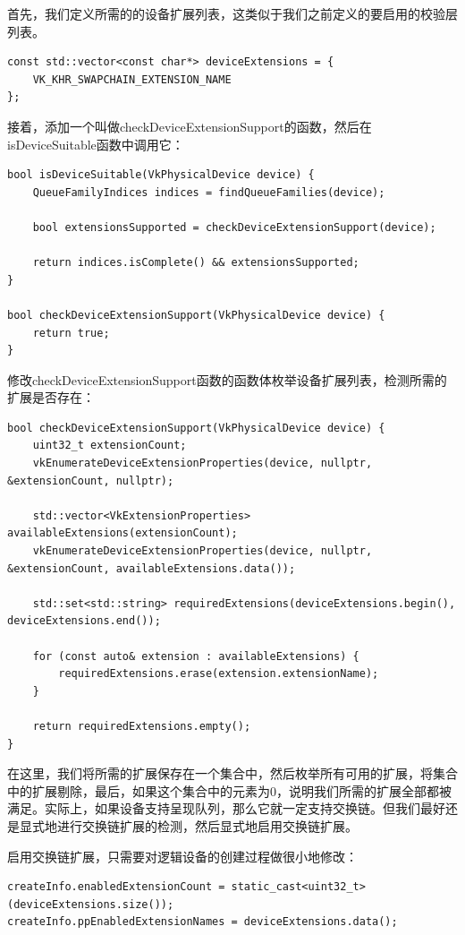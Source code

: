 \documentclass{ctexart}
\begin{document}
首先，我们定义所需的的设备扩展列表，这类似于我们之前定义的要启用的校验层列表。

\begin{lstlisting}[language={[ANSI]C}]
const std::vector<const char*> deviceExtensions = {
	VK_KHR_SWAPCHAIN_EXTENSION_NAME
};
\end{lstlisting}

接着，添加一个叫做checkDeviceExtensionSupport的函数，然后在isDeviceSuitable函数中调用它：

\begin{lstlisting}[language={[ANSI]C}]
bool isDeviceSuitable(VkPhysicalDevice device) {
	QueueFamilyIndices indices = findQueueFamilies(device);

	bool extensionsSupported = checkDeviceExtensionSupport(device);

	return indices.isComplete() && extensionsSupported;
}

bool checkDeviceExtensionSupport(VkPhysicalDevice device) {
	return true;
}
\end{lstlisting}

修改checkDeviceExtensionSupport函数的函数体枚举设备扩展列表，检测所需的扩展是否存在：

\begin{lstlisting}[language={[ANSI]C}]
bool checkDeviceExtensionSupport(VkPhysicalDevice device) {
	uint32_t extensionCount;
	vkEnumerateDeviceExtensionProperties(device, nullptr, &extensionCount, nullptr);

	std::vector<VkExtensionProperties> availableExtensions(extensionCount);
	vkEnumerateDeviceExtensionProperties(device, nullptr, &extensionCount, availableExtensions.data());

	std::set<std::string> requiredExtensions(deviceExtensions.begin(), deviceExtensions.end());

	for (const auto& extension : availableExtensions) {
		requiredExtensions.erase(extension.extensionName);
	}

	return requiredExtensions.empty();
}
\end{lstlisting}

在这里，我们将所需的扩展保存在一个集合中，然后枚举所有可用的扩展，将集合中的扩展剔除，最后，如果这个集合中的元素为0，说明我们所需的扩展全部都被满足。实际上，如果设备支持呈现队列，那么它就一定支持交换链。但我们最好还是显式地进行交换链扩展的检测，然后显式地启用交换链扩展。

启用交换链扩展，只需要对逻辑设备的创建过程做很小地修改：

\begin{lstlisting}[language={[ANSI]C}]
createInfo.enabledExtensionCount = static_cast<uint32_t>(deviceExtensions.size());
createInfo.ppEnabledExtensionNames = deviceExtensions.data();
\end{lstlisting}
\end{document}
